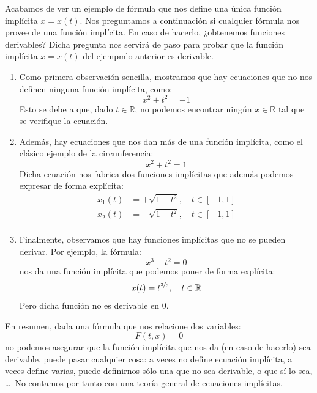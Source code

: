 Acabamos de ver un ejemplo de fórmula que nos define una única función implícita $x=x(t)$.  Nos preguntamos a continuación si cualquier fórmula nos provee de una función implícita. En caso de hacerlo, ¿obtenemos funciones derivables? Dicha pregunta nos servirá de paso para probar que la función implícita $x=x(t)$ del ejempmlo anterior es derivable.
\begin{enumerate}
    \item Como primera observación sencilla, mostramos que hay ecuaciones que no nos definen ninguna función implícita, como:
        \begin{equation*}
            x^2+t^2 = -1
        \end{equation*}
        Esto se debe a que, dado $t\in \mathbb{R}$, no podemos encontrar ningún $x\in \mathbb{R}$ tal que se verifique la ecuación.

    \item Además, hay ecuaciones que nos dan más de una función implícita, como el clásico ejemplo de la circunferencia:
        \begin{equation*}
            x^2 + t^2 = 1
        \end{equation*}
        Dicha ecuación nos fabrica dos funciones implícitas que además podemos expresar de forma explícita:
        \begin{align*}
            x_1(t) &= +\sqrt{1-t^2}, \quad t\in [-1,1] \\
            x_2(t) &= -\sqrt{1-t^2}, \quad t\in [-1,1] \\
        \end{align*}

    \item Finalmente, observamos que hay funciones implícitas que no se pueden derivar. Por ejemplo, la fórmula:
        \begin{equation*}
            x^3-t^2 = 0
        \end{equation*}
        nos da una función implícita que podemos poner de forma explícita:
        \begin{equation*}
            x(t) = t^{\nicefrac{2}{3}}, \quad t\in \mathbb{R}
        \end{equation*}
        Pero dicha función no es derivable en 0.
\end{enumerate}

En resumen, dada una fórmula que nos relacione dos variables:
\begin{equation*}
    F(t,x) = 0
\end{equation*}
no podemos asegurar que la función implícita que nos da (en caso de hacerlo) sea derivable, puede pasar cualquier cosa: a veces no define ecuación implícita, a veces define varias, puede definirnos sólo una que no sea derivable, o que sí lo sea, \ldots~No contamos por tanto con una teoría general de ecuaciones implícitas.\\

